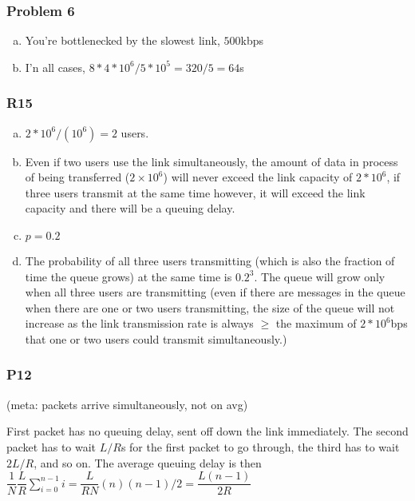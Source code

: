 \documentclass[11pt]{article}
\begin{document}
\subsubsection{Problem 6}

\begin{enumerate}[(a)]
    \item You're bottlenecked by the slowest link, $500$kbps
    \item I'n all cases, $8*4*10^6/5*10^5 = 320/5 = 64$s
\end{enumerate}

\subsubsection{R15}

\begin{enumerate}[(a)]
    \item $2*10^6 / (10^6) = 2$ users.
    \item Even if two users use the link simultaneously, the amount of data in process of being transferred ($2 \times 10^6$) will never exceed the link capacity of $2*10^6$, if three users transmit at the same time however, it will exceed the link capacity and there will be a queuing delay.
    \item $p = 0.2$
    \item The probability of all three users transmitting (which is also the fraction of time the queue grows) at the same time is $0.2^3$. The queue will grow only when all three users are transmitting (even if there are messages in the queue when there are one or two users transmitting, the size of the queue will not increase as the link transmission rate is always $\geq$ the maximum of $2*10^6$bps that one or two users could transmit simultaneously.)
\end{enumerate}

\subsubsection{P12}

(meta: packets arrive simultaneously, not on avg)

First packet has no queuing delay, sent off down the link immediately. The second packet has to wait $L/R$s for the first packet to go through, the third has to wait $2L/R$, and so on. The average queuing delay is then $\dfrac{1}{N} \dfrac{L}{R} \sum_{i=0}^{n-1} i = \dfrac{L}{RN} (n)(n-1)/2 = \dfrac{L(n-1)}{2R}$
\end{document}
